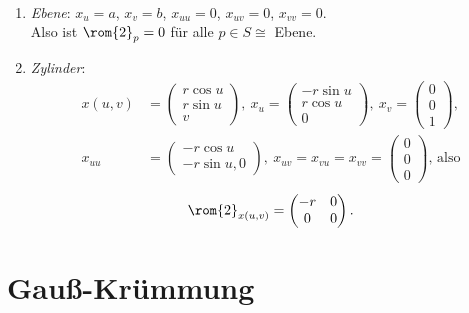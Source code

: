 \begin{example}
  \
  \begin{enumerate}
    \item \emph{Ebene}: \( x_u = a \), \( x_v = b \), \( x_{uu} = 0 \), \( x_{ uv } = 0 \), \( x_{ vv } = 0 \). \\
      Also ist \( \rom{2}_p = 0 \) für alle \( p \in S \cong \) Ebene.
    \item \emph{Zylinder}:
    \begin{align*}
      x(u,v) &= \left( \begin{smallmatrix}
        r\cos u \\ r\sin u \\ v
      \end{smallmatrix} \right), \ x_u = \left( \begin{smallmatrix}
        -r\sin u \\ r\cos u \\ 0
      \end{smallmatrix} \right), \ x_v = \left( \begin{smallmatrix}
        0 \\ 0 \\ 1
      \end{smallmatrix} \right), \\
      x_{uu} &= \left( \begin{smallmatrix}
        -r\cos u \\ -r\sin u, 0
      \end{smallmatrix} \right), \ x_{uv} = x_{vu} = x_{vv} = \left( \begin{smallmatrix}
         0 \\ 0 \\ 0
      \end{smallmatrix} \right)\text{, also}
    \end{align*}
    \begin{equation*}
      \rom{2}_{x(u,v)} = \begin{pmatrix}
        -r & 0 \\
        0 & 0
      \end{pmatrix}\text{.}
    \end{equation*}
  \end{enumerate}
\end{example}

\section{Gauß-Krümmung}


